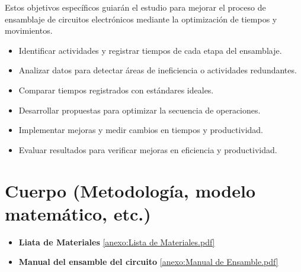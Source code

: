     Estos objetivos específicos guiarán el estudio para mejorar el proceso de ensamblaje de circuitos electrónicos mediante la optimización de tiempos y movimientos.
    \begin{itemize}
    \item \textbf{}Identificar actividades y registrar tiempos de cada etapa del ensamblaje.
    \item \textbf{}Analizar datos para detectar áreas de ineficiencia o actividades redundantes.
    \item \textbf{}Comparar tiempos registrados con estándares ideales.
    \item \textbf{}Desarrollar propuestas para optimizar la secuencia de operaciones.
    \item \textbf{}Implementar mejoras y medir cambios en tiempos y productividad.
    \item \textbf{}Evaluar resultados para verificar mejoras en eficiencia y productividad.
    \end{itemize}
    
    
    \section{Cuerpo (Metodología, modelo matemático, etc.)}
    
   
    \begin{itemize}
        \item \textbf{Liata de Materiales}
        \ref{anexo:Lista de Materiales.pdf}
    \end{itemize}
    
    \begin{itemize}
        \item \textbf{Manual del ensamble del circuito}
        \ref{anexo:Manual de Ensamble.pdf}
    \end{itemize}
         
